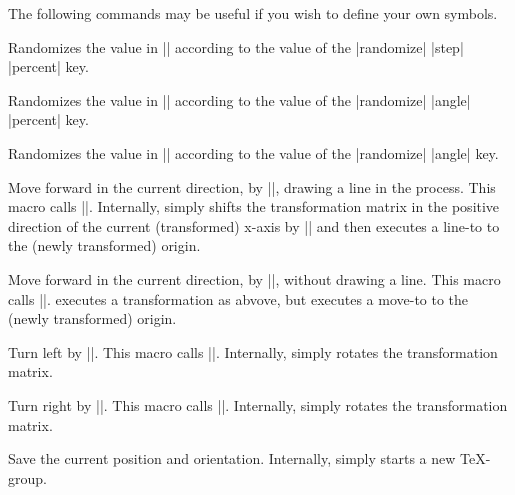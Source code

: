 \begin{command}{\pgfdeclarelindenmayersystem{}}
\begin{command}{\symbol{}}
The following commands may be useful if you wish to define your own
symbols.

\begin{command}{\pgflsystemrandomizestep}
	Randomizes the value in |\pgflsystemstep| according to the value of
	the |randomize| |step| |percent| key.
\end{command}

\begin{command}{\pgflsystemrandomizeleftangle}
	Randomizes the value in |\pgflsystemleftangle| according to the value of
	the |randomize| |angle| |percent| key.
\end{command}

\begin{command}{\pgflsystemrandomizerightangle}
	Randomizes the value in |\pgflsystemrightangle| according to the value of
	the |randomize| |angle| key.
\end{command}

\begin{command}{\pgflsystemdrawforward}
	Move forward in the current direction, by |\pgflsystemstep|,
	drawing a line in the process. This macro calls 
	|\pgflsystemrandomizestep|. Internally, \pgfname{} simply
	shifts the transformation matrix in the positive direction of 
	the current (transformed) x-axis by |\pgflsystemstep| 
	and then executes	a line-to to the (newly transformed) origin.
\end{command}

\begin{command}{\pgflsystemmoveforward}
	Move forward in the current direction, by |\pgflsystemstep|,
	without drawing a line. This macro calls 
	|\pgflsystemrandomizestep|. \pgfname{} executes a transformation
	as abvove, but executes	a move-to to the (newly transformed) 
	origin.
\end{command}

\begin{command}{\pgflsystemturnleft}
  Turn left by |\pgflsystemleftangle|. This macro calls 
	|\pgflsystemrandomizeleftangle|. Internally, \pgfname{}
	simply rotates the transformation matrix.
\end{command}

\begin{command}{\pgflsystemturnright}
	Turn right by |\pgflsystemrightangle|. This macro calls 
	|\pgflsystemrandomizerightangle|. Internally, \pgfname{}
	simply rotates the transformation matrix.
\end{command}

\begin{command}{\pgflsystemsavestate}
	Save the current position and orientation. Internally,
	\pgfname{} simply starts a new \TeX-group. 
\end{command}


\end{command}
\end{command}
